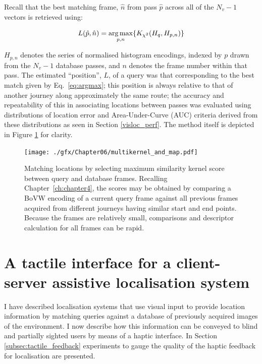 Recall that the best matching frame, $\hat{n}$ from pass $\hat{p}$ across all of the $N_v-1$ vectors is retrieved using: 

\begin{equation}
\centering
L(\hat{p},\hat{n}) = \underset{p,n}{\arg \max} \lbrace K_{\chi^2}(H_q,H_{p,n})\rbrace
\label{eq:argmax2}
\end{equation}


$H_{p,n}$ denotes the series of normalised histogram encodings, indexed by $p$ drawn from the $N_v-1$ database passes, and $n$ denotes the frame number within that pass.  The estimated ``position'', $L$, of a query was that corresponding to the best match given by Eq.~\ref{eq:argmax}; this position is always relative to that of another journey along approximately the same route; the accuracy and repeatability of this in associating locations between passes was evaluated using distributions of location error and Area-Under-Curve (AUC) criteria derived from these distributions as seen in Section \ref{visloc_perf}. The method itself is depicted in Figure \ref{fig:matching_from_kernels} for clarity.

\begin{figure}
\centering
\texttt{[image: ./gfx/Chapter06/multikernel\_and\_map.pdf]}
\caption{Matching locations by selecting maximum similarity kernel score between query and database frames. Recalling Chapter~\ref{ch:chapter4}, the scores may be obtained by comparing a BoVW encoding of a current query frame against all previous frames acquired from different journeys having similar start and end points. Because the frames are relatively small, comparisons and descriptor calculation for all frames can be rapid.}
\label{fig:matching_from_kernels}
\end{figure}


\section{A tactile interface for a client-server assistive localisation system}
\label{sec:tactile}
I have described localisation systems that use visual input to provide location information by matching queries against a da\-ta\-ba\-se of previously acquired images of the environment. I now describe how this information can be conveyed to blind and partially sighted users by means of a haptic interface. In Section \ref{subsec:tactile_feedback} experiments to gauge the quality of the haptic feedback for localisation are presented.

